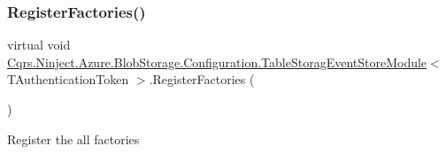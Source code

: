 \subsubsection{\texorpdfstring{Register\+Factories()}{RegisterFactories()}}
{\footnotesize\ttfamily virtual void \hyperlink{classCqrs_1_1Ninject_1_1Azure_1_1BlobStorage_1_1Configuration_1_1TableStoragEventStoreModule}{Cqrs.\+Ninject.\+Azure.\+Blob\+Storage.\+Configuration.\+Table\+Storag\+Event\+Store\+Module}$<$ T\+Authentication\+Token $>$.Register\+Factories (\begin{DoxyParamCaption}{ }\end{DoxyParamCaption})\hspace{0.3cm}{\ttfamily [virtual]}}



Register the all factories 

